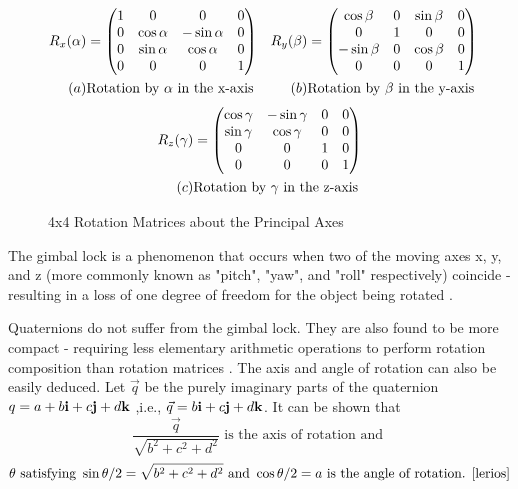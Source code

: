 \begin{figure}[h]
	\begin{align*}
			{R}_{x}{(\alpha)} &=
			\begin{pmatrix}
				1 & 0 & 0 & 0 \\
				0 & \cos{\alpha} & -\sin{\alpha} & 0 \\
				0 & \sin{\alpha} & \cos{\alpha} & 0 \\
				0 & 0 & 0 & 1
			\end{pmatrix}
			&
			{R}_{y}{(\beta)} &=
			\begin{pmatrix}
				\cos{\beta} & 0 & \sin{\beta} & 0 \\
				0 & 1 & 0 & 0 \\
				-\sin{\beta} & 0 & \cos{\beta} & 0 \\
				0 & 0 & 0 & 1
			\end{pmatrix} \\
			(a) & \text{Rotation by $\alpha$ in the x-axis} 
			& 
			(b) & \text{Rotation by $\beta$ in the y-axis}	
	 \end{align*} 
		 \begin{align*}
			{R}_{z}{(\gamma)} &=
			\begin{pmatrix}
				\cos{\gamma} & -\sin{\gamma} & 0 & 0 \\
				\sin{\gamma} & \cos{\gamma} &  0 & 0 \\
				0 & 0 & 1 & 0 \\
				0 & 0 & 0 & 1
		 \end{pmatrix} \\
		 (c) & \text{Rotation by $\gamma$ in the z-axis}	
		\end{align*}
		\caption{4x4 Rotation Matrices about the Principal Axes}
		\label{4x4}
\end{figure}

\noindent The gimbal lock is a phenomenon that occurs when two of the moving axes x, y, and z (more commonly known as "pitch", "yaw", and "roll" respectively) coincide - resulting in a loss of one degree of freedom for the object being rotated \cite{jia}. 


Quaternions do not suffer from the gimbal lock. They are also found to be more compact - requiring less elementary arithmetic operations to perform rotation composition than rotation matrices \cite{lerios}. The axis and angle of rotation can also be easily deduced. Let $\vec{q}$ be the purely imaginary parts of the quaternion $q = a + b\textbf{i} + c\textbf{j} + d\textbf{k} $ ,i.e., $\vec{q} = b\textbf{i} + c\textbf{j} + d\textbf{k}$. It can be shown that $$\frac{\vec{q}}{\sqrt{b^2+c^2+d^2}} \text{ is the axis of rotation and }$$ $$\theta \text{ satisfying } \sin{\theta/2} = \sqrt{b^2+c^2+d^2} \text{ and } \cos{\theta/2} = a \text{ is the angle of rotation. \cite{lerios}}$$

